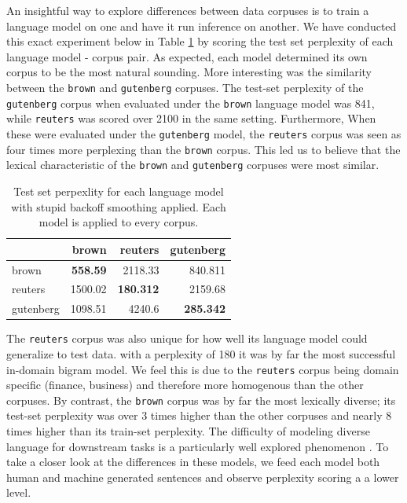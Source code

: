 \documentclass[11pt,a4paper]{article}
\begin{document}
An insightful way to explore differences between data corpuses is to train a language model on 
one and have it run inference on another. We have conducted this exact experiment below in Table \ref{table:backoff_test_perp} by scoring
the test set perplexity of each language model - corpus pair. As expected, each model determined its own corpus to be the most natural sounding.
More interesting was the similarity between the \texttt{brown} and \texttt{gutenberg} corpuses. The test-set perplexity of the \texttt{gutenberg} 
corpus when evaluated under the \texttt{brown} language model was 841, while \texttt{reuters} was scored over 2100 in the same setting. Furthermore,
When these were evaluated under the \texttt{gutenberg} model, the \texttt{reuters} corpus was seen as four times more perplexing than the \texttt{brown}
corpus. This led us to believe that the lexical characteristic of the \texttt{brown} and \texttt{gutenberg} corpuses were most similar.

\begin{table}[h]
\begin{tabular}{lrrr}
\hline
           &   brown &   reuters &   gutenberg \\
\hline
 brown     &  \textbf{ 558.59 } &  2118.33  &     840.811 \\
 reuters   & 1500.02 &   \textbf{ 180.312 } &    2159.68  \\
 gutenberg & 1098.51 &  4240.6   &     \textbf{ 285.342 } \\
\hline
\end{tabular}
\caption{Test set perpexlity for each language model with
  stupid backoff smoothing applied. Each model is applied to 
every corpus.}
\vspace{-10pt}
\label{table:backoff_test_perp}
\end{table}


The \texttt{reuters} corpus was also unique for how well its language model could generalize to test data. with a perplexity of 180 it was by far the
most successful in-domain bigram model. We feel this is due to the \texttt{reuters} corpus being domain specific (finance, business) and therefore more
homogenous than the other corpuses. By contrast, the \texttt{brown} corpus was by far the most lexically diverse; its test-set perplexity was over 
3 times higher than the other corpuses and nearly 8 times higher than its train-set perplexity. The difficulty of modeling diverse language for 
downstream tasks is a particularly well explored phenomenon \cite{ponte1998language}. To take a closer look at the differences in these models, 
we feed each model both human and machine generated sentences and observe perplexity scoring a a lower level.
\end{document}
